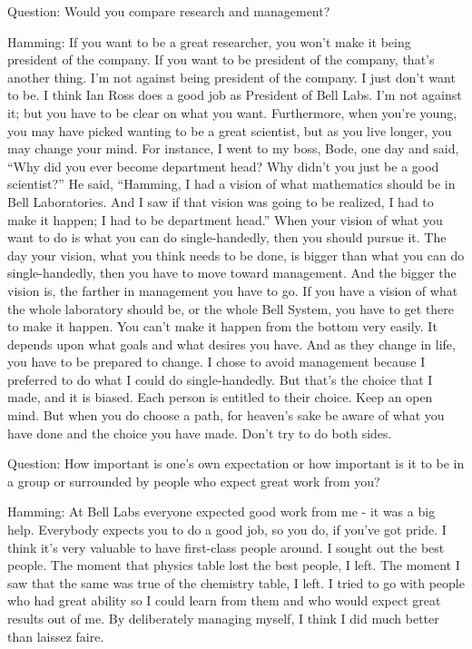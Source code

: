 \documentclass{article}
\begin{document}
Question: Would you compare research and management?

Hamming: If you want to be a great researcher, you won't make it being president of the company. If you want to be president of the company, that's another thing. I'm not against being president of the company. I just don't want to be. I think Ian Ross does a good job as President of Bell Labs. I'm not against it; but you have to be clear on what you want. Furthermore, when you're young, you may have picked wanting to be a great scientist, but as you live longer, you may change your mind. For instance, I went to my boss, Bode, one day and said, ``Why did you ever become department head? Why didn't you just be a good scientist?'' He said, ``Hamming, I had a vision of what mathematics should be in Bell Laboratories. And I saw if that vision was going to be realized, I had to make it happen; I had to be department head.'' When your vision of what you want to do is what you can do single-handedly, then you should pursue it. The day your vision, what you think needs to be done, is bigger than what you can do single-handedly, then you have to move toward management. And the bigger the vision is, the farther in management you have to go. If you have a vision of what the whole laboratory should be, or the whole Bell System, you have to get there to make it happen. You can't make it happen from the bottom very easily. It depends upon what goals and what desires you have. And as they change in life, you have to be prepared to change. I chose to avoid management because I preferred to do what I could do single-handedly. But that's the choice that I made, and it is biased. Each person is entitled to their choice. Keep an open mind. But when you do choose a path, for heaven's sake be aware of what you have done and the choice you have made. Don't try to do both sides.

Question: How important is one's own expectation or how important is it to be in a group or surrounded by people who expect great work from you?

Hamming: At Bell Labs everyone expected good work from me - it was a big help. Everybody expects you to do a good job, so you do, if you've got pride. I think it's very valuable to have first-class people around. I sought out the best people. The moment that physics table lost the best people, I left. The moment I saw that the same was true of the chemistry table, I left. I tried to go with people who had great ability so I could learn from them and who would expect great results out of me. By deliberately managing myself, I think I did much better than laissez faire.
\end{document}
